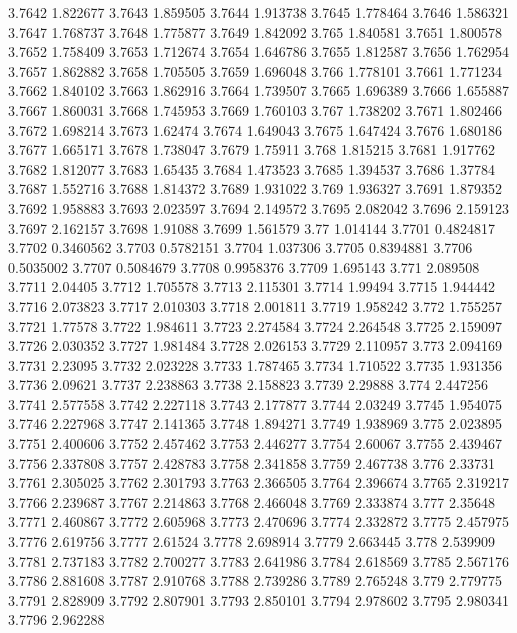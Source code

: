 3.7642  1.822677
3.7643  1.859505
3.7644  1.913738
3.7645  1.778464
3.7646  1.586321
3.7647  1.768737
3.7648  1.775877
3.7649  1.842092
3.765  1.840581
3.7651  1.800578
3.7652  1.758409
3.7653  1.712674
3.7654  1.646786
3.7655  1.812587
3.7656  1.762954
3.7657  1.862882
3.7658  1.705505
3.7659  1.696048
3.766  1.778101
3.7661  1.771234
3.7662  1.840102
3.7663  1.862916
3.7664  1.739507
3.7665  1.696389
3.7666  1.655887
3.7667  1.860031
3.7668  1.745953
3.7669  1.760103
3.767  1.738202
3.7671  1.802466
3.7672  1.698214
3.7673  1.62474
3.7674  1.649043
3.7675  1.647424
3.7676  1.680186
3.7677  1.665171
3.7678  1.738047
3.7679  1.75911
3.768  1.815215
3.7681  1.917762
3.7682  1.812077
3.7683  1.65435
3.7684  1.473523
3.7685  1.394537
3.7686  1.37784
3.7687  1.552716
3.7688  1.814372
3.7689  1.931022
3.769  1.936327
3.7691  1.879352
3.7692  1.958883
3.7693  2.023597
3.7694  2.149572
3.7695  2.082042
3.7696  2.159123
3.7697  2.162157
3.7698  1.91088
3.7699  1.561579
3.77  1.014144
3.7701  0.4824817
3.7702  0.3460562
3.7703  0.5782151
3.7704  1.037306
3.7705  0.8394881
3.7706  0.5035002
3.7707  0.5084679
3.7708  0.9958376
3.7709  1.695143
3.771  2.089508
3.7711  2.04405
3.7712  1.705578
3.7713  2.115301
3.7714  1.99494
3.7715  1.944442
3.7716  2.073823
3.7717  2.010303
3.7718  2.001811
3.7719  1.958242
3.772  1.755257
3.7721  1.77578
3.7722  1.984611
3.7723  2.274584
3.7724  2.264548
3.7725  2.159097
3.7726  2.030352
3.7727  1.981484
3.7728  2.026153
3.7729  2.110957
3.773  2.094169
3.7731  2.23095
3.7732  2.023228
3.7733  1.787465
3.7734  1.710522
3.7735  1.931356
3.7736  2.09621
3.7737  2.238863
3.7738  2.158823
3.7739  2.29888
3.774  2.447256
3.7741  2.577558
3.7742  2.227118
3.7743  2.177877
3.7744  2.03249
3.7745  1.954075
3.7746  2.227968
3.7747  2.141365
3.7748  1.894271
3.7749  1.938969
3.775  2.023895
3.7751  2.400606
3.7752  2.457462
3.7753  2.446277
3.7754  2.60067
3.7755  2.439467
3.7756  2.337808
3.7757  2.428783
3.7758  2.341858
3.7759  2.467738
3.776  2.33731
3.7761  2.305025
3.7762  2.301793
3.7763  2.366505
3.7764  2.396674
3.7765  2.319217
3.7766  2.239687
3.7767  2.214863
3.7768  2.466048
3.7769  2.333874
3.777  2.35648
3.7771  2.460867
3.7772  2.605968
3.7773  2.470696
3.7774  2.332872
3.7775  2.457975
3.7776  2.619756
3.7777  2.61524
3.7778  2.698914
3.7779  2.663445
3.778  2.539909
3.7781  2.737183
3.7782  2.700277
3.7783  2.641986
3.7784  2.618569
3.7785  2.567176
3.7786  2.881608
3.7787  2.910768
3.7788  2.739286
3.7789  2.765248
3.779  2.779775
3.7791  2.828909
3.7792  2.807901
3.7793  2.850101
3.7794  2.978602
3.7795  2.980341
3.7796  2.962288
